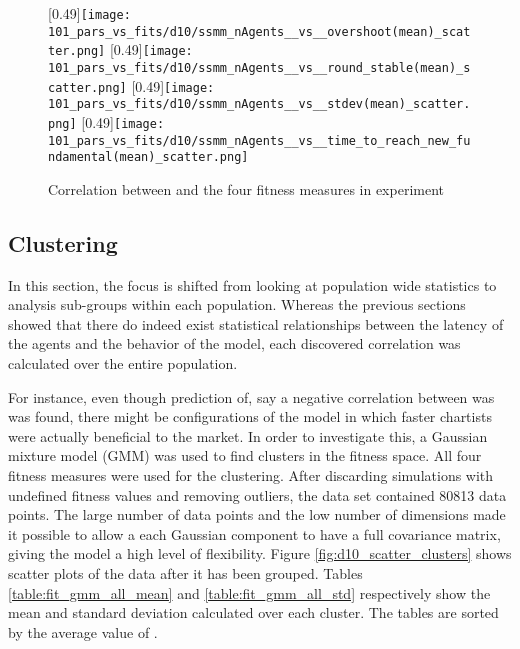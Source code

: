 \begin{figure}
	\centering
	[0.49\linewidth]{\texttt{[image: 101\_pars\_vs\_fits/d10/ssmm\_nAgents\_\_vs\_\_overshoot(mean)\_scatter.png]}}
	[0.49\linewidth]{\texttt{[image: 101\_pars\_vs\_fits/d10/ssmm\_nAgents\_\_vs\_\_round\_stable(mean)\_scatter.png]}}
	[0.49\linewidth]{\texttt{[image: 101\_pars\_vs\_fits/d10/ssmm\_nAgents\_\_vs\_\_stdev(mean)\_scatter.png]}}
	[0.49\linewidth]{\texttt{[image: 101\_pars\_vs\_fits/d10/ssmm\_nAgents\_\_vs\_\_time\_to\_reach\_new\_fundamental(mean)\_scatter.png]}}
	\caption{Correlation between \ssmmnAgents and the four fitness measures in experiment \dten}
	\label{fig:d10_parvfit_ssmmnAgents}
\end{figure}


\subsection{Clustering}
In this section, the focus is shifted from looking at population wide statistics to analysis sub-groups within each population. Whereas the previous sections showed that there do indeed exist statistical relationships between the latency of the agents and the behavior of the model, each discovered correlation was calculated over the entire population. 

For instance, even though prediction of, say a negative correlation between \timetoreachnewfundamental was \sclatencymu was found, there might be configurations of the model in which faster chartists were actually beneficial to the market. In order to investigate this, a Gaussian mixture model (GMM) was used to find clusters in the fitness space. All four fitness measures were used for the clustering. After discarding simulations with undefined fitness values and removing outliers, the data set contained 80813 data points. The large number of data points and the low number of dimensions made it possible to allow a each Gaussian component to have a full covariance matrix, giving the model a high level of flexibility. Figure \ref{fig:d10_scatter_clusters} shows scatter plots of the data after it has been grouped. Tables \ref{table:fit_gmm_all_mean} and \ref{table:fit_gmm_all_std} respectively show the mean and standard deviation calculated over each cluster. The tables are sorted by the average value of \overshoot.




